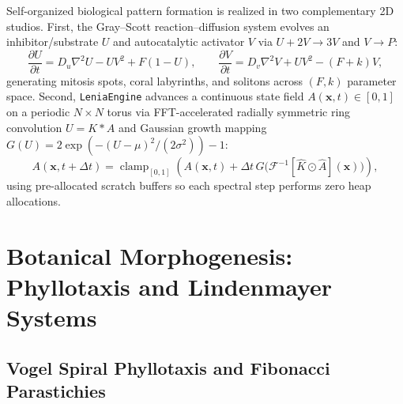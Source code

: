 \documentclass[12pt]{article}
\begin{document}
Self-organized biological pattern formation \cite{turing1952chemical, pearson1993complex} is realized in two complementary 2D studios. First, the Gray--Scott reaction--diffusion system evolves an inhibitor/substrate $U$ and autocatalytic activator $V$ via $U + 2V \rightarrow 3V$ and $V \rightarrow P$:
\begin{equation}
\frac{\partial U}{\partial t} = D_u \nabla^2 U - U V^2 + F(1 - U), \qquad
\frac{\partial V}{\partial t} = D_v \nabla^2 V + U V^2 - (F + k) V,
\end{equation}
generating mitosis spots, coral labyrinths, and solitons across $(F, k)$ parameter space. Second, \texttt{LeniaEngine} \cite{chan2019lenia} advances a continuous state field $A(\mathbf{x}, t) \in [0, 1]$ on a periodic $N \times N$ torus via FFT-accelerated radially symmetric ring convolution $U = K * A$ and Gaussian growth mapping $G(U) = 2 \exp\!\left(-(U - \mu)^2 / (2\sigma^2)\right) - 1$:
\begin{equation}
A(\mathbf{x}, t + \Delta t) = \operatorname{clamp}_{[0, 1]}\!\left(A(\mathbf{x}, t) + \Delta t \, G\big(\mathcal{F}^{-1}[\hat{K} \odot \hat{A}](\mathbf{x})\big)\right),
\end{equation}
using pre-allocated scratch buffers so each spectral step performs zero heap allocations.

\section{Botanical Morphogenesis: Phyllotaxis and Lindenmayer Systems}

\subsection{Vogel Spiral Phyllotaxis and Fibonacci Parastichies}
\end{document}
